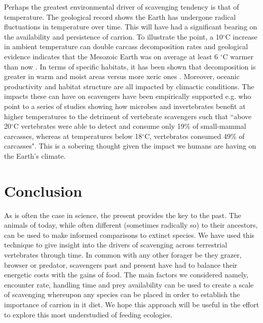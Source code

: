 \documentclass[a4paper,12pt]{article}
\begin{document}
Perhaps the greatest environmental driver of scavenging tendency is that of temperature. 
The geological record shows the Earth has undergone radical fluctuations in temperature over time.
This will have had a significant bearing on the availability and persistence of carrion.
To illustrate the point, a 10$^{\circ}$C increase in ambient temperature can double carcass decomposition rates \citep{parmenter2009carrion} and geological evidence indicates that the Mesozoic Earth was on average at least 6 $^{\circ}$C warmer than now \citep{sellwood2006mesozoic}.
In terms of specific habitats, it has been shown that decomposition is greater in warm and moist areas versus more xeric ones \citep{beasley2015vertebrates}.
Moreover, oceanic productivity and habitat structure are all impacted by climactic conditions.
The impacts these can have on scavengers have been empirically supported e.g. \cite{beasley2015vertebrates} who point to a series of studies showing how microbes and invertebrates benefit at higher temperatures to the detriment of vertebrate scavengers such that ``above 20$^{\circ}$C vertebrates were able to detect and consume only 19\% of small-mammal carcasses, whereas at temperatures below 18$^{\circ}$C, vertebrates consumed 49\% of carcasses".
This is a sobering thought given the impact we humans are having on the Earth's climate. 

\section*{Conclusion} 
As is often the case in science, the present provides the key to the past.
The animals of today, while often different (sometimes radically so) to their ancestors, can be used to make informed comparisons to extinct species. 
We have used this technique to give insight into the drivers of scavenging across terrestrial vertebrates through time.
In common with any other forager be they grazer, browser or predator, scavengers past and present have had to balance their energetic costs with the gains of food. 
The main factors we considered namely, encounter rate, handling time and prey availability can be used to create a scale of scavenging whereupon any species can be placed in order to establish the importance of carrion in it diet.  
We hope this approach will be useful in the effort to explore this most understudied of feeding ecologies. 
\end{document}
